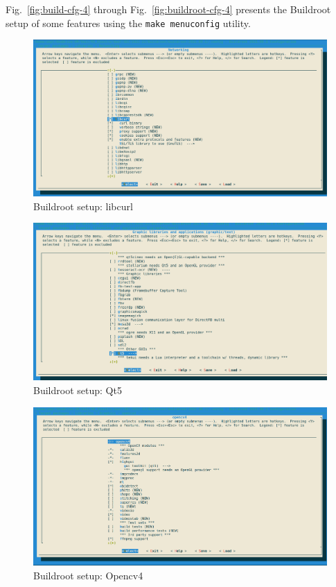 Fig.~\ref{fig:build-cfg-4} through Fig.~\ref{fig:buildroot-cfg-4} presents the
Buildroot setup of some features using the \texttt{make menuconfig} utility.
% 
\begin{figure}[htb!]
\centering
    \includegraphics[width=0.8\columnwidth]{./img/buildroot-cfg-1.png}
  \caption{Buildroot setup: libcurl}%
\label{fig:buildroot-cfg-1}
\end{figure}
% 
\begin{figure}[htb!]
\centering
    \includegraphics[width=0.8\columnwidth]{./img/buildroot-cfg-2.png}
  \caption{Buildroot setup: Qt5}%
\label{fig:buildroot-cfg-2}
\end{figure}
% 
\begin{figure}[htb!]
\centering
    \includegraphics[width=0.8\columnwidth]{./img/buildroot-cfg-3.png}
  \caption{Buildroot setup: Opencv4}%
\label{fig:buildroot-cfg-3}
\end{figure}
